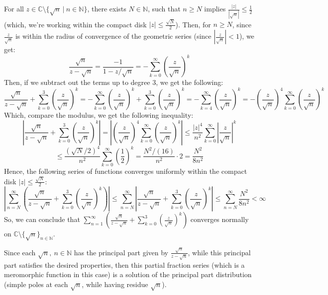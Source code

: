 \documentclass{article}
\begin{document}
For all $z\in\mathbb{C}\setminus\{\sqrt{n}\ |\ n\in\mathbb{N}\}$, there exists $N\in\mathbb{N}$, such that $n\geq N$ implies $\frac{|z|}{|\sqrt{n}|}\leq\frac{1}{2}$ (which, we're working within the compact disk $|z|\leq \frac{\sqrt{N}}{2}$). Then, for $n\geq N$, since $\frac{z}{\sqrt{n}}$ is within the radius of convergence of the geometric series (since $\left|\frac{z}{\sqrt{n}}\right|<1$), we get:
$$\frac{\sqrt{n}}{z-\sqrt{n}}=\frac{-1}{1-z/\sqrt{n}}=-\sum_{k=0}^{\infty}\left(\frac{z}{\sqrt{n}}\right)^k$$
Then, if we subtract out the terms up to degree 3, we get the following:
$$\frac{\sqrt{n}}{z-\sqrt{n}}+\sum_{k=0}^{3}\left(\frac{z}{\sqrt{n}}\right)^k=-\sum_{k=0}^{\infty}\left(\frac{z}{\sqrt{n}}\right)^k+\sum_{k=0}^{3}\left(\frac{z}{\sqrt{n}}\right)^k=-\sum_{k=4}^{\infty}\left(\frac{z}{\sqrt{n}}\right)^k = -\left(\frac{z}{\sqrt{n}}\right)^4\sum_{k=0}^{\infty}\left(\frac{z}{\sqrt{n}}\right)^k$$
Which, compare the modulus, we get the following inequality:
$$\left|\frac{\sqrt{n}}{z-\sqrt{n}}+\sum_{k=0}^{3}\left(\frac{z}{\sqrt{n}}\right)^k\right|= \left|\left(\frac{z}{\sqrt{n}}\right)^4\sum_{k=0}^{\infty}\left(\frac{z}{\sqrt{n}}\right)^k\right|\leq\frac{|z|^4}{n^2}\sum_{k=0}^{\infty}\left|\frac{z}{\sqrt{n}}\right|^k$$
$$\leq \frac{(\sqrt{N}/2)^4}{n^2}\sum_{k=0}^{\infty}\left(\frac{1}{2}\right)^k = \frac{N^2/(16)}{n^2}\cdot 2 = \frac{N^2}{8n^2}$$
Hence, the following series of functions converges uniformly within the compact disk $|z|\leq \frac{\sqrt{N}}{2}$:
$$\left|\sum_{n=N}^{\infty}\left(\frac{\sqrt{n}}{z-\sqrt{n}}+\sum_{k=0}^{3}\left(\frac{z}{\sqrt{n}}\right)^k\right)\right|\leq \sum_{n=N}^{\infty}\left|\frac{\sqrt{n}}{z-\sqrt{n}}+\sum_{k=0}^{3}\left(\frac{z}{\sqrt{n}}\right)^k\right| \leq \sum_{n=N}^{\infty}\frac{N^2}{8n^2}<\infty$$
So, we can conclude that $\sum_{n=1}^{\infty}\left(\frac{\sqrt{n}}{z-\sqrt{n}}+\sum_{k=0}^{3}\left(\frac{z}{\sqrt{n}}\right)^k\right)$ converges normally on $\mathbb{C}\setminus\{\sqrt{n}\}_{n\in\mathbb{N}}$. 

\hfil

Since each $\sqrt{n},\ n\in\mathbb{N}$ has the principal part given by $\frac{\sqrt{n}}{z-\sqrt{n}}$, while this principal part satisfies the desired properties, then this partial fraction series (which is a meromorphic function in this case) is a solution of the principal part distribution (simple poles at each $\sqrt{n}$, while having residue $\sqrt{n}$).
\end{document}
